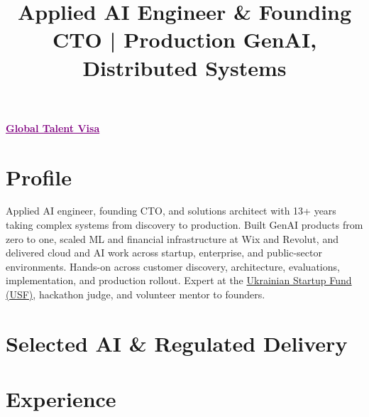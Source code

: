 \documentclass[11pt,a4paper,sans]{moderncv}
\title{Applied AI Engineer \& Founding CTO | Production GenAI, Distributed Systems}
\begin{document}
\makecvtitle

\newcommand{\colorhref}[2]{\href{#1}{\textcolor{webblue}{\underline{#2}}}}

\newcommand{\richcventry}[6]{%
  \cventry{#1}{#2}{#3}{#4}{#5}{}%
  \vspace{-2mm}%
  #6%
}

\textcolor{purple}{\underline{\textbf{Global Talent Visa}}}
\section{Profile}
Applied AI engineer, founding CTO, and solutions architect with 13+ years taking complex systems from discovery to production. Built GenAI products from zero to one, scaled ML and financial infrastructure at Wix and Revolut, and delivered cloud and AI work across startup, enterprise, and public-sector environments. Hands-on across customer discovery, architecture, evaluations, implementation, and production rollout. Expert at the \href{https://usf.com.ua/en}{Ukrainian Startup Fund (USF)}, hackathon judge, and volunteer mentor to founders.


\section{Selected AI \& Regulated Delivery}


\section{Experience}
\end{document}
